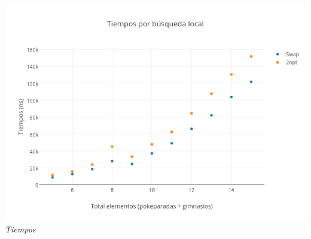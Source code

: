 \begin{figure}[h] 
 \centering
       \label{fig:randomDist1}
    \label{fig:randomMejora1}
\end{figure}

   \vspace*{0.3cm} \vspace*{0.3cm}
  \begin{center}
	\includegraphics[scale=0.50]{./EJ3/tiemposLocales20M.png}
	\label{fig:randomTiempos1}	
	\\{\textit{Tiempos}}
  \end{center}
  \vspace*{0.3cm} 

